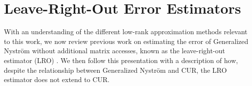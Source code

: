 \documentclass[11pt]{article}
\begin{document}



\section{Leave-Right-Out Error Estimators}
With an understanding of the different low-rank approximation methods relevant to this work, we now review previous work on estimating the error  of Generalized Nystr\"om without additional matrix accesses, known as the leave-right-out estimator (LRO) \cite{LazPearPrit26}. We then follow this presentation with a description of how, despite the relationship between Generalized Nystr\"om and CUR, the LRO estimator does not extend to CUR.
\end{document}
